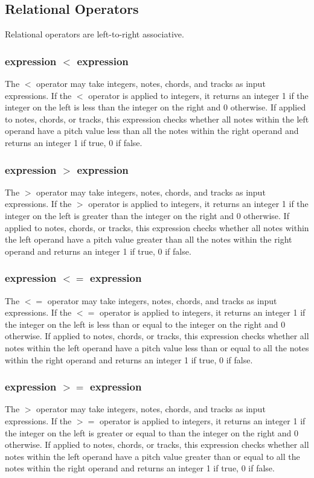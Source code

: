 \documentclass[letterpaper]{article}
\begin{document}
\subsection{Relational Operators}
Relational operators are left-to-right associative.
\subsubsection{expression $<$ expression}
The $<$ operator may take integers, notes, chords, and tracks as input expressions. If the $<$ operator is applied to integers, it returns an integer 1 if the integer on the left is less than the integer on the right and 0 otherwise. If applied to notes, chords, or tracks, this expression checks whether all notes within the left operand have a pitch value less than all the notes within the right operand and returns an integer 1 if true, 0 if false. 
\subsubsection{expression $>$ expression}
The $>$ operator may take integers, notes, chords, and tracks as input expressions. If the $>$ operator is applied to integers, it returns an integer 1 if the integer on the left is greater than the integer on the right and 0 otherwise. If applied to notes, chords, or tracks, this expression checks whether all notes within the left operand have a pitch value greater than all the notes within the right operand and returns an integer 1 if true, 0 if false.
\subsubsection{expression $<=$ expression}
The $<=$ operator may take integers, notes, chords, and tracks as input expressions. If the $<=$ operator is applied to integers, it returns an integer 1 if the integer on the left is less than or equal to the integer on the right and 0 otherwise. If applied to notes, chords, or tracks, this expression checks whether all notes within the left operand have a pitch value less than or equal to all the notes within the right operand and returns an integer 1 if true, 0 if false. 
\subsubsection{expression $>=$ expression}
The $>$ operator may take integers, notes, chords, and tracks as input expressions. If the $>=$ operator is applied to integers, it returns an integer 1 if the integer on the left is greater or equal to than the integer on the right and 0 otherwise. If applied to notes, chords, or tracks, this expression checks whether all notes within the left operand have a pitch value greater than or equal to all the notes within the right operand and returns an integer 1 if true, 0 if false.
\end{document}
